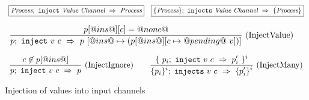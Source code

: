 
\begin{figure*}
\begin{minipage}[t]{1\textwidth}

$$
\begin{array}{lr} 
  \boxed{\textit{Process};~\texttt{inject}~\textit{Value}~\textit{Channel}~\Rightarrow~\textit{Process}}
 & 
  \boxed{\{ \textit{Process} \};~\texttt{injects}~\textit{Value}~\textit{Channel}~\Rightarrow~\{ \textit{Process} \}}
 \end{array}
$$

$$
\enskip \frac {\displaystyle 
  p[@ins@][c] = @none@
} {\displaystyle 
  p;~\texttt{inject}~v~c~\Rightarrow~p~[@ins@ \mapsto (p[@ins@][c \mapsto @pending@~v]) ] 
} \  \mbox{(InjectValue)} \enskip
$$

$$
\ruleIN{
  c \not\in p[@ins@]
}{
  \ProcInject{p}{v}{c}{p}
}{InjectIgnore}
%
\quad
%
\ruleIN{
  \{~ \ProcInject{p_i}{v}{c}{p'_i} ~\}^i
}{
  \ProcsInject{\sgl{p_i}^i}{v}{c}{\sgl{p'_i}^i}
}{InjectMany}
$$

\end{minipage}
\caption{Injection of values into input channels}
\label{fig:Process:Eval:Inject}
\end{figure*}


